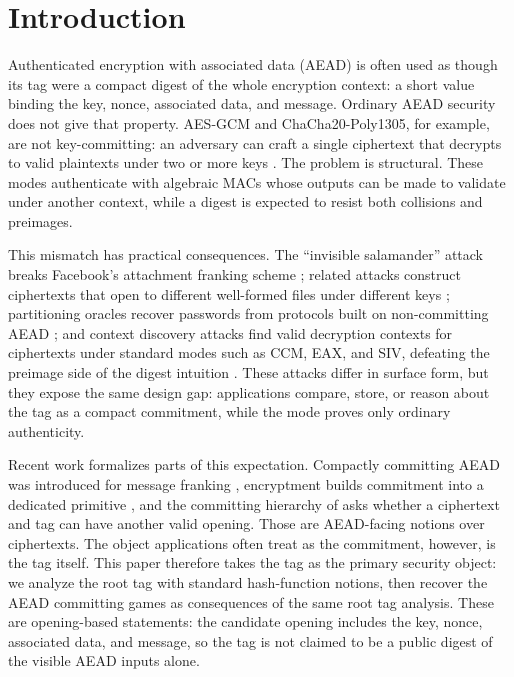 \section{Introduction}
\label{sec:introduction}

Authenticated encryption with associated data (AEAD) is often used as though
its tag were a compact digest of the whole encryption context: a short value
binding the key, nonce, associated data, and message. Ordinary AEAD security
does not give that property. AES-GCM and ChaCha20-Poly1305, for example, are
not key-committing: an adversary can craft a single ciphertext that decrypts to
valid plaintexts under two or more keys \cite{DGRW18, ADGKLS22}. The problem is
structural. These modes authenticate with algebraic MACs whose outputs can be
made to validate under another context, while a digest is expected to resist
both collisions and preimages.

This mismatch has practical consequences. The ``invisible salamander'' attack
breaks Facebook's attachment franking scheme \cite{DGRW18}; related attacks
construct ciphertexts that open to different well-formed files under different
keys \cite{ADGKLS22}; partitioning oracles recover passwords from protocols
built on non-committing AEAD \cite{LGR21}; and context discovery attacks find
valid decryption contexts for ciphertexts under standard modes such as CCM,
EAX, and SIV, defeating the preimage side of the digest intuition
\cite{MLGR23}. These attacks differ in surface form, but they expose the same
design gap: applications compare, store, or reason about the tag as a compact
commitment, while the mode proves only ordinary authenticity.

Recent work formalizes parts of this expectation. Compactly committing AEAD was
introduced for message franking \cite{GLR17}, encryptment builds commitment into
a dedicated primitive \cite{DGRW18}, and the committing hierarchy of
\cite{BH22} asks whether a ciphertext and tag can have another valid opening.
Those are AEAD-facing notions over ciphertexts. The object applications often
treat as the commitment, however, is the tag itself. This paper therefore takes
the tag as the primary security object: we analyze the root tag with standard
hash-function notions, then recover the AEAD committing games as consequences of
the same root tag analysis. These are opening-based statements: the candidate
opening includes the key, nonce, associated data, and message, so the tag is not
claimed to be a public digest of the visible AEAD inputs alone.

